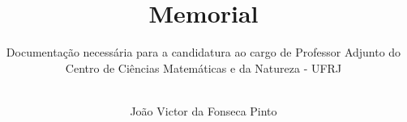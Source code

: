 \documentclass[a4paper,11pt]{article}
\title{Memorial}
\author[]{Documentação necessária para a candidatura ao cargo de Professor Adjunto do 
          Centro de Ciências Matemáticas e da Natureza - UFRJ\\}
\author[]{\\João Victor da Fonseca Pinto}
\begin{document}
 
\maketitle
\flushbottom

\newpage




\newpage

















\end{document}
